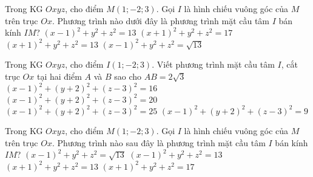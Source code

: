 \begin{ex}%
	Trong KG $Oxyz$, cho điểm $M(1;-2;3)$. Gọi $I$ là hình chiếu vuông góc của $M$ trên trục $Ox$. Phương trình nào dưới đây là phương trình mặt cầu tâm $I$ bán kính $IM$?
	\choice
	{\True $(x-1)^2+y^2+z^2=13$}
	{$(x+1)^2+y^2+z^2=17$}
	{$(x+1)^2+y^2+z^2=13$}
	{$(x-1)^2+y^2+z^2=\sqrt{13}$}
\end{ex}

\begin{ex}%
	Trong KG $Oxyz$, cho điểm $I(1;-2;3)$. Viết phương trình mặt cầu tâm $I$, cắt trục $Ox$ tại hai điểm $A$ và $B$ sao cho $AB=2\sqrt{3}$
	\choice
	{\True $(x-1)^2+(y+2)^2+(z-3)^2=16$}
	{$(x-1)^2+(y+2)^2+(z-3)^2=20$}
	{$(x-1)^2+(y+2)^2+(z-3)^2=25$}
	{$(x-1)^2+(y+2)^2+(z-3)^2=9$}
\end{ex}

\begin{ex}%
	Trong KG $Oxyz$, cho điểm $M(1;-2;3)$. Gọi $I$ là hình chiếu vuông góc của $M$ trên trục $Ox$. Phương trình nào sau đây là phương trình mặt cầu tâm $I$ bán kính $IM$?
	\choice
	{$(x-1)^2+y^2+z^2=\sqrt{13}$}
	{\True $(x-1)^2+y^2+z^2=13$}
	{$(x+1)^2+y^2+z^2=13$}
	{$(x+1)^2+y^2+z^2=17$}
\end{ex}

